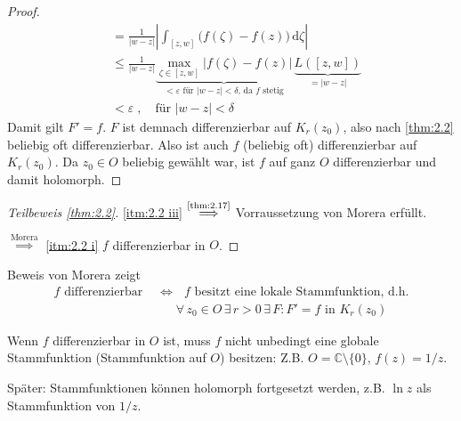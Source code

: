 \begin{theorem}
\begin{proof}
    \begin{align*}
      &= \frac{1}{|w - z|} \left| \int_{[z,w]} \Big( f(\zeta) - f(z) \Big) \, \mathrm{d}\zeta \right| \\
      &\leq \frac{1}{|w - z|} \underbrace{\max\limits_{\zeta \in [z,w]} \Big|f(\zeta) - f(z)\Big|}_{< \varepsilon \text{ für } |w-z| < \delta \text{, da $f$ stetig}} \, \underbrace{L([z,w])}_{=|w-z|} \\
      &< \varepsilon \; , \quad \text{für } |w-z| < \delta
    \end{align*}
    Damit gilt $F' = f$. 
    $F$ ist demnach differenzierbar auf $K_r(z_0)$, also nach \ref{thm:2.2} beliebig oft differenzierbar.
    Also ist auch $f$ (beliebig oft) differenzierbar auf $K_r(z_0)$.
    Da $z_0\in O$ beliebig gewählt war, ist $f$ auf ganz $O$ differenzierbar und damit holomorph.
  \end{proof}
\end{theorem}


\begin{proof}[Teilbeweis \ref{thm:2.2}]
  \ref{itm:2.2 iii} $\overset{\text{\ref{thm:2.17}}}{\implies}$ Vorraussetzung von Morera erfüllt.
  
  $\overset{\text{Morera}}{\implies}$ \ref{itm:2.2 i} $f$ differenzierbar in $O$.
\end{proof}

\begin{notice}
  \begin{enum-arab}
    \item Beweis von Morera zeigt
    \begin{align*}
      \text{$f$ differenzierbar } &\iff \text{ $f$ besitzt eine lokale Stammfunktion, d.h.} \\
      &\phantom{\iff} \forall \, z_0 \in O \, \exists \, r > 0 \, \exists \, F : F' = f \text{ in } K_r(z_0)
    \end{align*}
    
    \item Wenn $f$ differenzierbar in $O$ ist, muss $f$ nicht unbedingt eine globale Stammfunktion (Stammfunktion auf $O$) besitzen: Z.B. $O = \mathbb{C} \setminus \{0\}$, $f(z) = 1/z$.
    
    Später: Stammfunktionen können holomorph fortgesetzt werden, z.B. $\ln z$ als Stammfunktion von $1/z$.
  \end{enum-arab}
\end{notice}

